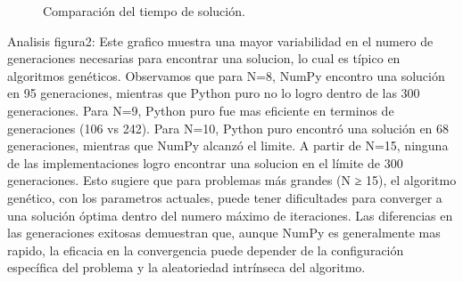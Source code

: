\documentclass[journal]{IEEEtran}
\begin{document}
\begin{figure}[h!]
\centering
{}
\caption{Comparación del tiempo de solución.}
\label{fig:tiempo_solucion_comparacion_small}
\end{figure}

Analisis figura2: Este grafico muestra una mayor variabilidad en el numero de generaciones necesarias para encontrar una solucion, lo cual es típico en algoritmos genéticos. Observamos que para N=8, NumPy encontro una solución en 95 generaciones, mientras que Python puro no lo logro dentro de las 300 generaciones. Para N=9, Python puro fue mas eficiente en terminos de generaciones (106 vs 242). Para N=10, Python puro encontró una solución en 68 generaciones, mientras que NumPy alcanzó el limite. A partir de N=15, ninguna de las implementaciones logro encontrar una solucion en el límite de 300 generaciones. Esto sugiere que para problemas más grandes (N ≥ 15), el algoritmo genético, con los parametros actuales, puede tener dificultades para converger a una solución óptima dentro del numero máximo de iteraciones. Las diferencias en las generaciones exitosas demuestran que, aunque NumPy es generalmente mas rapido, la eficacia en la convergencia puede depender de la configuración específica del problema y la aleatoriedad intrínseca del algoritmo.
\end{document}
